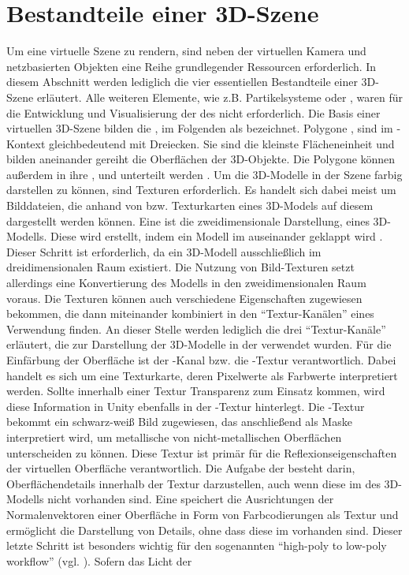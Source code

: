 	\section{Bestandteile einer 3D-Szene}
	\label{sec:3dsetup}
	Um eine virtuelle Szene zu rendern, sind neben der virtuellen Kamera und netzbasierten Objekten eine Reihe grundlegender Ressourcen erforderlich. In diesem Abschnitt werden lediglich die vier essentiellen Bestandteile einer 3D-Szene erläutert. Alle weiteren Elemente, wie z.B. Partikelsysteme oder , waren für die Entwicklung und Visualisierung der \mapp des \vmds nicht erforderlich. Die Basis einer virtuellen 3D-Szene bilden die , im Folgenden als  bezeichnet. Polygone , sind im -Kontext gleichbedeutend mit Dreiecken. Sie sind die kleinste Flächeneinheit und bilden aneinander gereiht die Oberflächen der 3D-Objekte. Die Polygone können außerdem in ihre  ,   und   unterteilt werden \figref{\ref{fig:polyhedra-edge-face-vertex}}. Um die 3D-Modelle in der Szene farbig darstellen zu können, sind Texturen erforderlich. Es handelt sich dabei meist um Bilddateien, die anhand von  bzw. Texturkarten eines 3D-Models auf diesem dargestellt werden können. Eine  ist die zweidimensionale Darstellung, eines 3D-Modells. Diese wird erstellt, indem ein Modell im  auseinander geklappt wird \figref{\ref{fig:uv_map}}. Dieser Schritt ist erforderlich, da ein 3D-Modell ausschließlich im dreidimensionalen Raum existiert. Die Nutzung von Bild-Texturen setzt allerdings eine Konvertierung des Modells in den zweidimensionalen Raum voraus. Die Texturen können auch verschiedene Eigenschaften zugewiesen bekommen, die dann miteinander kombiniert in den \enquote{Textur-Kanälen} eines  Verwendung finden. An dieser Stelle werden lediglich die drei \enquote{Textur-Kanäle} erläutert, die zur Darstellung der 3D-Modelle in der \mapp verwendet wurden. Für die Einfärbung der Oberfläche ist der -Kanal bzw. die -Textur verantwortlich. Dabei handelt es sich um eine Texturkarte, deren Pixelwerte als Farbwerte interpretiert werden. Sollte innerhalb einer Textur Transparenz zum Einsatz kommen, wird diese Information in Unity ebenfalls in der -Textur hinterlegt. Die -Textur bekommt ein schwarz-weiß Bild zugewiesen, das anschließend als Maske interpretiert wird, um metallische von nicht-metallischen Oberflächen unterscheiden zu können. Diese Textur ist primär für die Reflexionseigenschaften der virtuellen Oberfläche verantwortlich. Die Aufgabe der  besteht darin, Oberflächendetails innerhalb der Textur darzustellen, auch wenn diese im  des 3D-Modells nicht vorhanden sind. Eine  speichert die Ausrichtungen der Normalenvektoren einer Oberfläche in Form von Farbcodierungen als Textur und ermöglicht die Darstellung von Details, ohne dass diese im  vorhanden sind. Dieser letzte Schritt ist besonders wichtig für den sogenannten \enquote{high-poly to low-poly workflow} (vgl. \cite{Neumann.11.11.2020}). Sofern das Licht der 